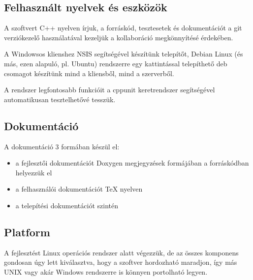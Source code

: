 \documentclass[a4paper,12pt]{article}
\begin{document}
\subsection{Felhasznált nyelvek és eszközök}

A szoftvert C++ nyelven írjuk, a forráskód, tesztesetek és dokumentációt a git
verziókezelő használatával kezeljük a kollaboráció megkönnyítésé érdekében.

A Windowsos klienshez NSIS segítségével készítünk telepítőt, Debian Linux
(és más, ezen alapuló, pl. Ubuntu) rendszerre egy kattintással telepíthető
deb csomagot készítünk mind a kliensből, mind a szerverből.

A rendszer legfontosabb funkcióit a cppunit keretrendszer segítségével
automatikusan tesztelhetővé tesszük.

\subsection{Dokumentáció}

A dokumentáció 3 formában készül el:
\begin{itemize}
\item a fejlesztői dokumentációt Doxygen megjegyzések formájában a forráskódban
helyezzük el
\item a felhasználói dokumentációt \TeX{} nyelven
\item a telepítési dokumentációt szintén
\end{itemize}

\subsection{Platform}

A fejlesztést Linux operációs rendszer alatt végezzük, de az összes komponens
gondosan úgy lett kiválasztva, hogy a szoftver hordozható maradjon, így más
UNIX vagy akár Windows rendszerre is könnyen portolható legyen.
\end{document}
